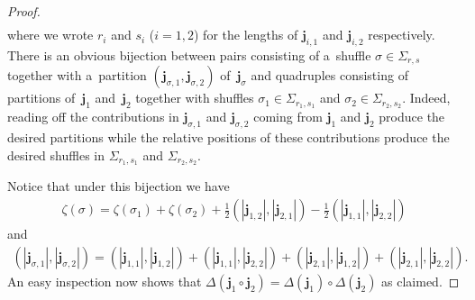 \begin{proof}
\begin{gather*}
\end{gather*}
where we wrote $r_i$ and $s_i$ ($i=1,2$) for the lengths of $\mathbf{j}_{i,1}$ and $\mathbf{j}_{i,2}$ respectively.
There is an obvious bijection between pairs consisting of a~shuf\/f\/le $\sigma\in\Sigma_{r,s}$ together with a~partition
$(\mathbf{j}_{\sigma,1},\mathbf{j}_{\sigma,2})$ of~$\mathbf{j}_\sigma$ and quadruples consisting of partitions of~$\mathbf{j}_1$ and~$\mathbf{j}_2$ together with shuf\/f\/les $\sigma_1\in\Sigma_{r_1,s_1}$ and
$\sigma_2\in\Sigma_{r_2,s_2}$.
Indeed, reading of\/f the contributions in $\mathbf{j}_{\sigma,1}$ and $\mathbf{j}_{\sigma,2}$ coming from $\mathbf{j}_1$
and $\mathbf{j}_2$ produce the desired partitions while the relative positions of these contributions produce the
desired shuf\/f\/les in $\Sigma_{r_1,s_1}$ and $\Sigma_{r_2,s_2}$.

Notice that under this bijection we have
\begin{gather*}
\zeta(\sigma)=\zeta(\sigma_1)+\zeta(\sigma_2)+\frac{1}{2}(|\mathbf{j}_{1,2}|,|\mathbf{j}_{2,1}|)-\frac{1}{2}(|\mathbf{j}_{1,1}|,|\mathbf{j}_{2,2}|)
\end{gather*}
and
\begin{gather*}
(|\mathbf{j}_{\sigma,1}|,|\mathbf{j}_{\sigma,2}|)
=(|\mathbf{j}_{1,1}|,|\mathbf{j}_{1,2}|)+(|\mathbf{j}_{1,1}|,|\mathbf{j}_{2,2}|)
+(|\mathbf{j}_{2,1}|,|\mathbf{j}_{1,2}|)+(|\mathbf{j}_{2,1}|,|\mathbf{j}_{2,2}|).
\end{gather*}
An easy inspection now shows that $\Delta(\mathbf{j}_1\circ\mathbf{j}_2)=\Delta(\mathbf{j}_1)\circ\Delta(\mathbf{j}_2)$
as claimed.
\end{proof}
